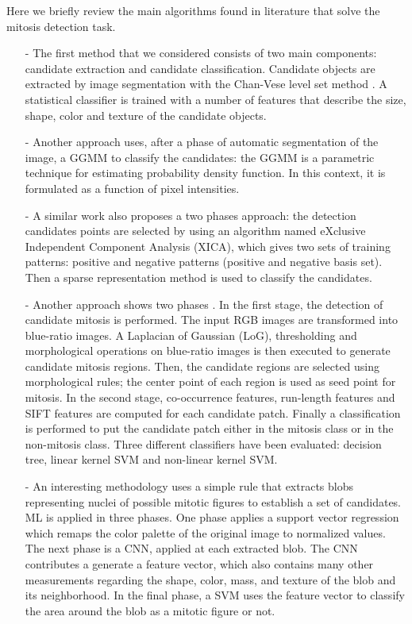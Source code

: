 Here we briefly review the main algorithms found in literature that solve the mitosis detection task.

\begin{itemize}
 \item[-] The first method that we considered \cite{Mitosis01} consists of two main components: candidate extraction and candidate classification.
Candidate objects are extracted by image segmentation with the Chan-Vese level set method \cite{moelich2003tracking}.
A statistical classifier is trained with a number of features that describe the size, shape, color and texture of the candidate objects.
 \item[-] Another approach \cite{mitosisDetectBreastCancer01} uses, after a phase of automatic segmentation of the image, a \Gls{GGMM} to classify
the candidates: the \Gls{GGMM} is a parametric technique for estimating probability density function. In this context, it is formulated as a function of pixel intensities.
 \item[-] A similar work \cite{breastCancerMitosisPCA_ICA} also proposes a two phases approach: the detection candidates points are selected by using
an algorithm named eXclusive Independent Component Analysis (XICA), which gives two sets of training patterns: positive and negative patterns (positive and negative basis set).
Then a sparse representation method \cite{wright2009robust} is used to classify the candidates.
 \item[-] Another approach shows two phases \cite{irshad2011automated}.
In the first stage, the detection of candidate mitosis is performed. The input RGB
images are transformed into blue-ratio images. A Laplacian of Gaussian (LoG), thresholding and morphological operations on blue-ratio images is then executed 
to generate candidate mitosis regions. Then, the candidate regions are selected using morphological rules; the center point of each region is used  as seed point for mitosis.
In the second stage, co-occurrence features, run-length features and SIFT features are computed for each candidate patch.
Finally a classification is performed to put the candidate patch either in the mitosis class or in the non-mitosis class.
Three different classifiers have been evaluated: decision tree, linear kernel \Gls{SVM} and non-linear kernel \Gls{SVM}.
 \item[-] An interesting methodology \cite{mitoticRecognition03Agreement} uses a simple rule that extracts blobs representing nuclei of possible mitotic figures to establish a set of
candidates. \Gls{ML} is applied in three phases. One phase applies a support vector regression which remaps the color palette of the original image to
normalized values. The next phase is a \Gls{CNN}, applied at each extracted blob. The \Gls{CNN} contributes a generate a feature vector, which also contains many other
measurements regarding the shape, color, mass, and texture of the blob and its neighborhood. In the final phase, a \Gls{SVM} uses the feature vector to
classify the area around the blob as a mitotic figure or not.
\end{itemize}


